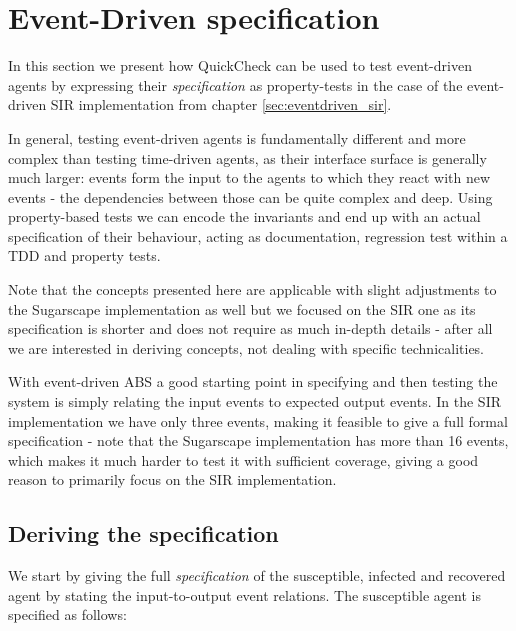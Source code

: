 \section{Event-Driven specification}
In this section we present how QuickCheck can be used to test event-driven agents by expressing their \textit{specification} as property-tests in the case of the event-driven SIR implementation from chapter \ref{sec:eventdriven_sir}.

In general, testing event-driven agents is fundamentally different and more complex than testing time-driven agents, as their interface surface is generally much larger: events form the input to the agents to which they react with new events - the dependencies between those can be quite complex and deep. Using property-based tests we can encode the invariants and end up with an actual specification of their behaviour, acting as documentation, regression test within a TDD and property tests.

Note that the concepts presented here are applicable with slight adjustments to the Sugarscape implementation as well but we focused on the SIR one as its specification is shorter and does not require as much in-depth details - after all we are interested in deriving concepts, not dealing with specific technicalities.

With event-driven ABS a good starting point in specifying and then testing the system is simply relating the input events to expected output events. In the SIR implementation we have only three events, making it feasible to give a full formal specification - note that the Sugarscape implementation has more than 16 events, which makes it much harder to test it with sufficient coverage, giving a good reason to primarily focus on the SIR implementation. 

\subsection{Deriving the specification}
We start by giving the full \textit{specification} of the susceptible, infected and recovered agent by stating the input-to-output event relations. The susceptible agent is specified as follows:

